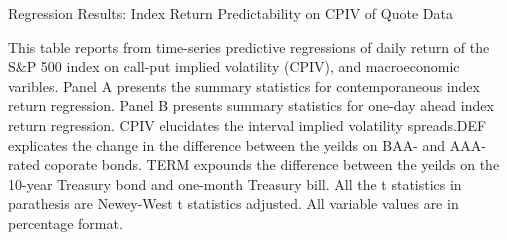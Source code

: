 \begin{table}[h]

\caption{Regression Results: Index Return Predictability on CPIV of Quote Data}\label{table:regression2}
\begin{threeparttable}

\medskip

{\scriptsize 
This table reports from time-series predictive regressions of daily return of the S\&P 500 index on call-put implied volatility (CPIV), and macroeconomic varibles. Panel A presents the summary statistics for contemporaneous index return regression. Panel B presents summary statistics for one-day ahead index return regression. CPIV elucidates the interval implied volatility spreads.DEF explicates the change in the difference between the yeilds on BAA- and AAA-rated coporate bonds. TERM expounds the difference between the yeilds on the 10-year Treasury bond and one-month Treasury bill. All the t statistics in parathesis are Newey-West t statistics adjusted. All variable values are in percentage format.  
}
\medskip

\begin{subtable}[t]{\linewidth}


\end{subtable}
\end{threeparttable}
\end{table}
